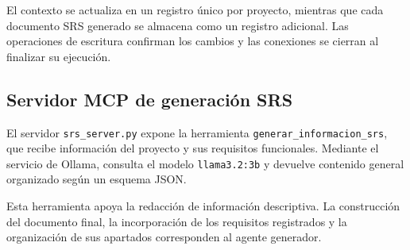 El contexto se actualiza en un registro único
por proyecto, mientras que cada documento SRS
generado se almacena como un registro adicional.
Las operaciones de escritura confirman los cambios
y las conexiones se cierran al finalizar su ejecución.

\subsection{Servidor MCP de generación SRS}


El servidor \texttt{srs\_server.py} expone la herramienta
\texttt{generar\_informacion\_srs}, que recibe información
del proyecto y sus requisitos funcionales.
Mediante el servicio de Ollama, consulta el modelo
\texttt{llama3.2:3b} y devuelve contenido general
organizado según un esquema JSON.

Esta herramienta apoya la redacción de información
descriptiva. La construcción del documento final,
la incorporación de los requisitos registrados
y la organización de sus apartados corresponden
al agente generador.


